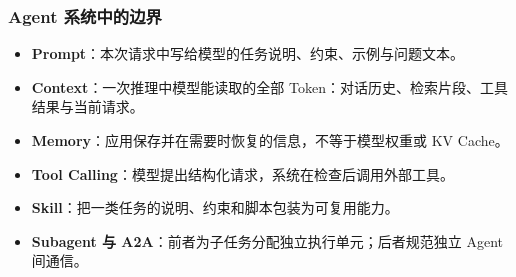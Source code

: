 \subsubsection*{Agent 系统中的边界}
\begin{itemize}
\item \textbf{Prompt}：本次请求中写给模型的任务说明、约束、示例与问题文本。 
\item \textbf{Context}：一次推理中模型能读取的全部 Token：对话历史、检索片段、工具结果与当前请求。 
\item \textbf{Memory}：应用保存并在需要时恢复的信息，不等于模型权重或 KV Cache。 
\item \textbf{Tool Calling}：模型提出结构化请求，系统在检查后调用外部工具。 
\item \textbf{Skill}：把一类任务的说明、约束和脚本包装为可复用能力。 
\item \textbf{Subagent 与 A2A}：前者为子任务分配独立执行单元；后者规范独立 Agent 间通信。 
\end{itemize}

